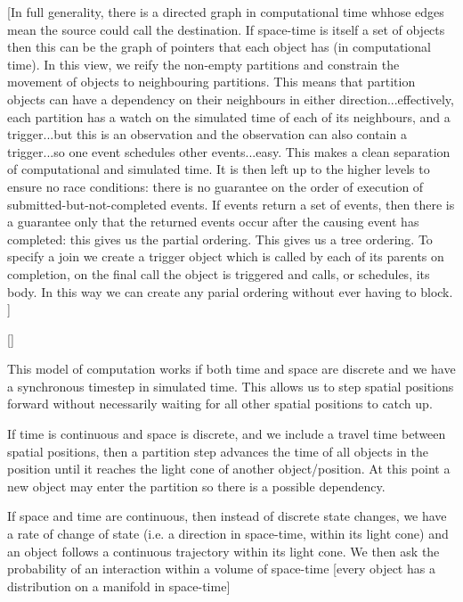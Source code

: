 \documentclass[a4paper]{article}
\begin{document}
[In full generality, there is a directed graph in computational time whhose edges mean the source could call the destination. If space-time is itself a set of objects then this can be the graph of pointers that each object has (in computational time). In this view, we reify the non-empty partitions and constrain the movement of objects to neighbouring partitions. This means that partition objects can have a dependency on their neighbours in either direction...effectively, each partition has a watch on the simulated time of each of its neighbours, and a trigger...but this is an observation and the observation can also contain a trigger...so one event schedules other events...easy. This makes a clean separation of computational and simulated time. It is then left up to the higher levels to ensure no race conditions: there is no guarantee on the order of execution of submitted-but-not-completed events. If events return a set of events, then there is a guarantee only that the returned events occur after the causing event has completed: this gives us the partial ordering. This gives us a tree ordering. To specify a join we create a trigger object which is called by each of its parents on completion, on the final call the object is triggered and calls, or schedules, its body. In this way we can create any parial ordering without ever having to block. ]

[]

This model of computation works if both time and space are discrete and we have a synchronous timestep in simulated time. This allows us to step spatial positions forward without necessarily waiting for all other spatial positions to catch up.

If time is continuous and space is discrete, and we include a travel time between spatial positions, then a partition step advances the time of all objects in the position until it reaches the light cone of another object/position. At this point a new object may enter the partition so there is a possible dependency.

If space and time are continuous, then instead of discrete state changes, we have a rate of change of state (i.e. a direction in space-time, within its light cone) and an object follows a continuous trajectory within its light cone. We then ask the probability of an interaction within a volume of space-time [every object has a distribution on a manifold in space-time]
\end{document}

